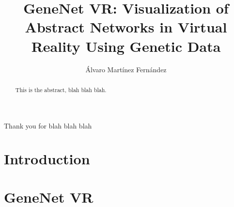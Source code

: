 \documentclass[USenglish]{uit-thesis}
\begin{document}

\title{GeneNet VR: Visualization of Abstract Networks in Virtual Reality Using Genetic Data}
\author{\'Alvaro Mart\'inez Fern\'andez}

\pgfplotsset{width=\textwidth}

\maketitle

\frontmatter

%


\begin{epigraph}
\end{epigraph}

\begin{abstract}
This is the abstract, blah blah blah.
\end{abstract}

\begin{acknowledgement}
Thank you for blah blah blah
\end{acknowledgement}

\tableofcontents

\mainmatter

\chapter{Introduction}


\chapter{GeneNet VR}

\end{document}
